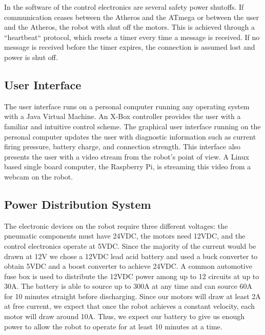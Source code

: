 \documentclass[letterpaper,12pt]{article}
\begin{document}
\noindent In the software of the control electronics are several safety power shutoffs. If communication ceases between the Atheros and the ATmega or between the user and the Atheros, the robot with shut off the motors. This is achieved through a “heartbeat“ protocol, which resets a timer every time a message is received. If no message is received before the timer expires, the connection is assumed lost and power is shut off.\\

\subsection{User Interface}
\noindent The user interface runs on a personal computer running any operating system with a Java Virtual Machine. An X-Box controller provides the user with a familiar and intuitive control scheme. The graphical user interface running on the personal computer updates the user with diagnostic information such as current firing pressure, battery charge, and connection strength. This interface also presents the user with a video stream from the robot’s point of view. A Linux based single board computer, the Raspberry Pi, is streaming this video from a webcam on the robot.\\

\subsection{Power Distribution System}
\noindent The electronic devices on the robot require three different voltages: the pneumatic components must have 24VDC, the motors need 12VDC, and the control electronics operate at 5VDC. Since the majority of the current would be drawn at 12V we chose a 12VDC lead acid battery and used a buck converter to obtain 5VDC and a boost converter to achieve 24VDC. A common automotive fuse box is used to distribute the 12VDC power among up to 12 circuits at up to 30A. The battery is able to source up to 300A at any time and can source 60A for 10 minutes straight before discharging. Since our motors will draw at least 2A at free current, we expect that once the robot achieves a constant velocity, each motor will draw around 10A. Thus, we expect our battery to give us enough power to allow the robot to operate for at least 10 minutes at a time.\\
\end{document}
